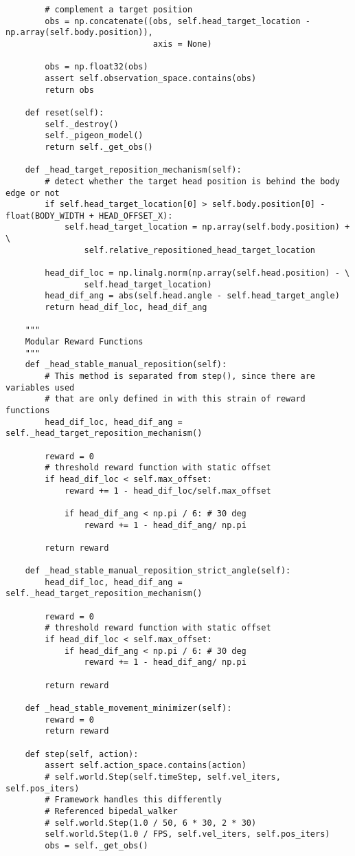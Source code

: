 \begin{lstlisting}
        # complement a target position
        obs = np.concatenate((obs, self.head_target_location - np.array(self.body.position)),
                              axis = None)

        obs = np.float32(obs)
        assert self.observation_space.contains(obs)
        return obs

    def reset(self):
        self._destroy()
        self._pigeon_model()
        return self._get_obs()

    def _head_target_reposition_mechanism(self):
        # detect whether the target head position is behind the body edge or not
        if self.head_target_location[0] > self.body.position[0] - float(BODY_WIDTH + HEAD_OFFSET_X):
            self.head_target_location = np.array(self.body.position) + \
                self.relative_repositioned_head_target_location

        head_dif_loc = np.linalg.norm(np.array(self.head.position) - \
                self.head_target_location)
        head_dif_ang = abs(self.head.angle - self.head_target_angle)
        return head_dif_loc, head_dif_ang

    """
    Modular Reward Functions
    """
    def _head_stable_manual_reposition(self):
        # This method is separated from step(), since there are variables used
        # that are only defined in with this strain of reward functions
        head_dif_loc, head_dif_ang = self._head_target_reposition_mechanism()

        reward = 0
        # threshold reward function with static offset
        if head_dif_loc < self.max_offset:
            reward += 1 - head_dif_loc/self.max_offset

            if head_dif_ang < np.pi / 6: # 30 deg
                reward += 1 - head_dif_ang/ np.pi

        return reward

    def _head_stable_manual_reposition_strict_angle(self):
        head_dif_loc, head_dif_ang = self._head_target_reposition_mechanism()

        reward = 0
        # threshold reward function with static offset
        if head_dif_loc < self.max_offset:
            if head_dif_ang < np.pi / 6: # 30 deg
                reward += 1 - head_dif_ang/ np.pi

        return reward

    def _head_stable_movement_minimizer(self):
        reward = 0
        return reward

    def step(self, action):
        assert self.action_space.contains(action)
        # self.world.Step(self.timeStep, self.vel_iters, self.pos_iters)
        # Framework handles this differently
        # Referenced bipedal_walker
        # self.world.Step(1.0 / 50, 6 * 30, 2 * 30)
        self.world.Step(1.0 / FPS, self.vel_iters, self.pos_iters)
        obs = self._get_obs()


\end{lstlisting}

